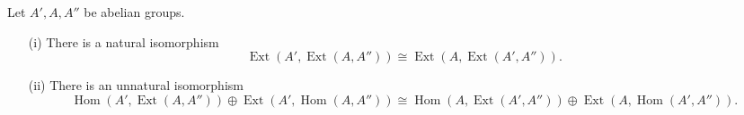 Let $A', A, A''$ be abelian groups.
\begin{enumerate}
\item[(i)] There is a natural isomorphism
$$\operatorname{Ext}(A', \operatorname{Ext}(A, A'')) \cong \operatorname{Ext}(A, \operatorname{Ext}(A', A'')).$$
\item[(ii)] There is an unnatural isomorphism
$$\operatorname{Hom}(A', \operatorname{Ext}(A, A'')) \oplus \operatorname{Ext}(A', \operatorname{Hom}(A, A'')) \cong \operatorname{Hom}(A, \operatorname{Ext}(A', A'')) \oplus \operatorname{Ext}(A, \operatorname{Hom}(A', A'')).$$
\end{enumerate}
